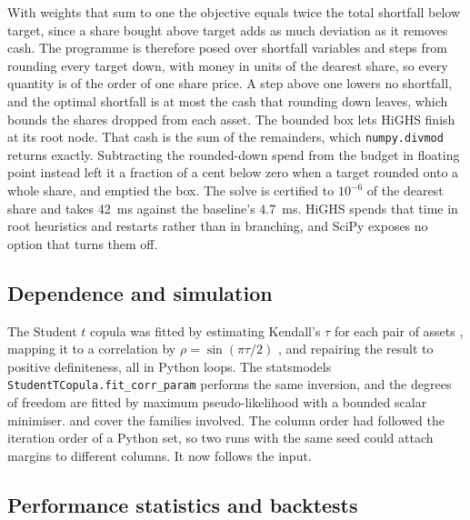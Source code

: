 With weights that sum to one the objective equals twice the total shortfall
below target, since a share bought above target adds as much deviation as it
removes cash. The programme is therefore posed over shortfall variables and
steps from rounding every target down, with money in units of the dearest
share, so every quantity is of the order of one share price. A step above one
lowers no shortfall, and the optimal shortfall is at most the cash that
rounding down leaves, which bounds the shares dropped from each asset. The
bounded box lets HiGHS finish at its root node. That cash is the sum of the
remainders, which \texttt{numpy.divmod} returns exactly. Subtracting the
rounded-down spend from the budget in floating point instead left it a
fraction of a cent below zero when a target rounded onto a whole share, and
emptied the box. The solve is certified to
$10^{-6}$ of the dearest share and takes 42~ms against the baseline's 4.7~ms.
HiGHS spends that time in root heuristics and restarts rather than in
branching, and SciPy exposes no option that turns them off.

\subsection{Dependence and simulation}

The Student $t$ copula \citep{demarta_t_2005,embrechts_correlation_2002}
was fitted by estimating Kendall's $\tau$ for each pair of assets
\citep{knight_computer_1966}, mapping it to a correlation by
$\rho = \sin(\pi \tau / 2)$ \citep{lindskog_kendalls_2003}, and repairing the
result to positive definiteness, all in Python loops. The statsmodels
\texttt{StudentTCopula.fit\_corr\_param} performs the same inversion, and the
degrees of freedom are fitted by maximum pseudo-likelihood
\citep{genest_semiparametric_1995,joe_asymptotic_2005} with a bounded scalar
minimiser. \citet{nelsen_introduction_1999} and \citet{joe_dependence_2014}
cover the families involved. The column order had followed the iteration
order of a Python set, so two runs with the same seed could attach margins to
different columns. It now follows the input.

\subsection{Performance statistics and backtests}

